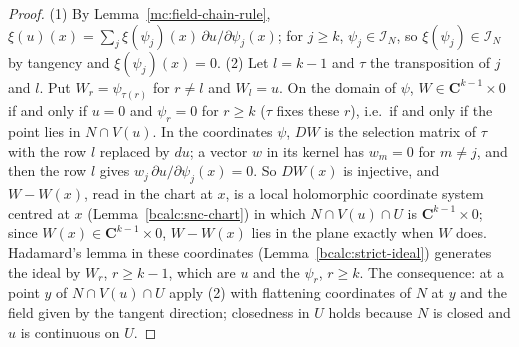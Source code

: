 \begin{proof}
\leanok
(1) By Lemma~\ref{mc:field-chain-rule}, \(\xi(u)(x)=\sum_j\xi(\psi_j)(x)\,\partial u/\partial\psi_j(x)\); for \(j\ge k\), \(\psi_j\in\mathcal I_N\), so \(\xi(\psi_j)\in\mathcal I_N\) by
tangency and \(\xi(\psi_j)(x)=0\).
(2) Let \(l=k-1\) and \(\tau\) the transposition of \(j\) and \(l\). Put \(W_r=\psi_{\tau(r)}\) for \(r\ne l\) and \(W_l=u\). On the domain of \(\psi\), \(W\in\mathbf C^{k-1}\times0\)
if and only if \(u=0\) and \(\psi_r=0\) for \(r\ge k\) (\(\tau\) fixes these \(r\)), i.e.\ if and only if the point lies in \(N\cap V(u)\). In the coordinates \(\psi\), \(DW\) is
the selection matrix of \(\tau\) with the row \(l\) replaced by \(du\); a vector \(w\) in its kernel has \(w_m=0\) for \(m\ne j\), and then the row \(l\) gives
\(w_j\,\partial u/\partial\psi_j(x)=0\). So \(DW(x)\) is injective, and \(W-W(x)\), read in the chart at \(x\), is a local holomorphic coordinate system centred at \(x\)
(Lemma~\ref{bcalc:snc-chart}) in which \(N\cap V(u)\cap U\) is \(\mathbf C^{k-1}\times0\); since \(W(x)\in\mathbf C^{k-1}\times0\), \(W-W(x)\) lies in the plane exactly when \(W\) does.
Hadamard's lemma in these coordinates (Lemma~\ref{bcalc:strict-ideal}) generates the ideal by \(W_r\), \(r\ge k-1\), which are \(u\) and the \(\psi_r\), \(r\ge k\).
The consequence: at a point \(y\) of \(N\cap V(u)\cap U\) apply (2) with flattening coordinates of \(N\) at \(y\) and the field given by the tangent direction; closedness in
\(U\) holds because \(N\) is closed and \(u\) is continuous on \(U\).
\end{proof}